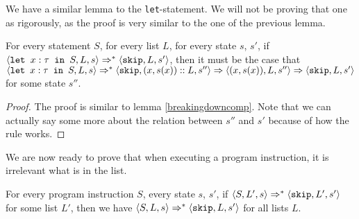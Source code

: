 We have a similar lemma to the \texttt{let}-statement. We will not be proving that one as rigorously, as the proof is very similar to the one of the previous lemma. 

\begin{lemma}
\label{breakingdownlet}
For every statement $S$, for every list $L$, for every state $s$, $s'$, if $\langle \texttt{let }x : \tau \texttt{ in } S, L, s \rangle \Rightarrow ^{*} \langle \texttt{skip}, L, s' \rangle$, then it must be the case that $\langle \texttt{let }x : \tau \texttt{ in } S, L, s \rangle \Rightarrow ^{*} \langle \texttt{skip}, (x,s(x))::L, s'' \rangle \Rightarrow \langle (x,s(x)), L, s'' \rangle \Rightarrow \langle \texttt{skip}, L, s' \rangle$ for some state $s''$. 
\end{lemma}

\begin{proof}
The proof is similar to lemma \ref{breakingdowncomp}. Note that we can actually say some more about the relation between $s''$ and $s'$ because of how the rule \setsos works. 
\end{proof}

We are now ready to prove that when executing a program instruction, it is irrelevant what is in the list.  

\begin{proposition}
\label{listsdontmatter}
For every program instruction $S$, every state $s$, $s'$, if $\langle S, L', s \rangle \Rightarrow ^{*} \langle \texttt{skip}, L', s' \rangle$ for some list $L'$, then we have $\langle S, L, s \rangle \Rightarrow ^{*} \langle \texttt{skip}, L, s' \rangle$ for all lists $L$. 
\end{proposition}

